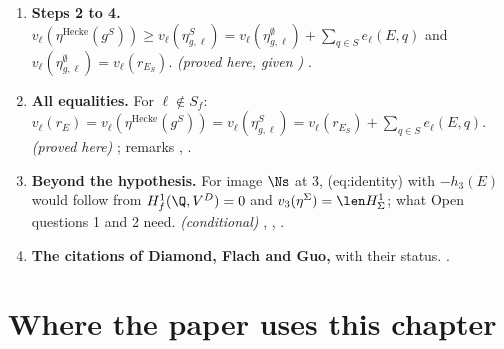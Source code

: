 \begin{enumerate}[label=\textbf{\thechapter.\arabic*}]
; Commentary on Remark rem:afterquant (2) and Open question 6 .
\item \textbf{Steps 2 to 4.} $v_\ell(\eta^{\mathrm{Hecke}}(g^S))\ge v_\ell(\eta^S_{g,\ell})=v_\ell(\eta^\emptyset_{g,\ell})+\sum_{q\in S}e_\ell(E,q)$ and $v_\ell(\eta^\emptyset_{g,\ell})=v_\ell(r_{E_S})$. \emph{(proved here, given )}
.
\item \textbf{All equalities.} For $\ell\notin S_f$: $v_\ell(r_E)=v_\ell(\eta^{\mathrm{Hecke}}(g^S))=v_\ell(\eta^S_{g,\ell})=v_\ell(r_{E_S})+\sum_{q\in S}e_\ell(E,q)$. \emph{(proved here)} ; remarks
, .
\item \textbf{Beyond the hypothesis.} For image $\Ns$ at $3$, (eq:identity) with $-h_3(E)$ would follow from $H^1_f(\Q,V^D)=0$ and $v_3(\eta^\Sigma)=\len H^1_\Sigma$; what Open questions 1 and 2 need. \emph{(conditional)}
, , .
\item \textbf{The citations of Diamond, Flach and Guo,} with their status. .
\end{enumerate}

\section*{Where the paper uses this chapter}

